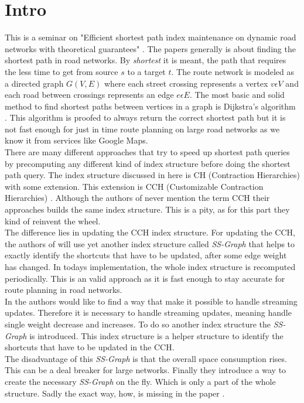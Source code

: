 \documentclass[twocolumn]{article}
\begin{document}


\section{Intro}

This is a seminar on "Efficient shortest path index maintenance on dynamic
road networks with theoretical guarantees" \cite{Ouyang2020}. The papers generally is
about finding the shortest path in road networks. By \textit{shortest} it is meant,
the path that requires the less time to get from source $s$ to a target $t$. The route
network is modeled as a directed graph $G(V,E)$ where each street crossing represents a
vertex $v \epsilon V$ and each road between crossings represents an edge $e \epsilon E$.
The most basic and solid method to find shortest paths between vertices in a graph is
Dijkstra's algorithm \cite{Dijkstra1959}. This algorithm is proofed to always return the
correct shortest path but it is not fast enough for just in time route planning on large
road networks as we know it from services like Google Maps.
\\
There are many
different approaches that try to speed up shortest path queries by precomputing
any different kind of index structure before doing the shortest path query. The index
structure discussed in here \cite{Ouyang2020} is CH (Contraction Hierarchies)\cite{Geisberger}
with some extension. This extension is CCH (Customizable Contraction Hierarchies)
\cite{Dibbelt2014}. Although the authors of \cite{Ouyang2020} never mention the term
CCH their approaches builds the same index structure. This is a pity, as for this part
they kind of reinvent the wheel.
\\
The difference lies in updating
the CCH index structure. For updating the CCH, the authors of \cite{Ouyang2020} will use yet another
index structure called \textit{SS-Graph} that helps to exactly identify the shortcuts that
have to be updated, after some edge weight has changed. In todays implementation, the whole
index structure is recomputed periodically. This is an valid approach as it is fast enough
to stay accurate for route planning in road networks.
\\
In \cite{Ouyang2020} the authors would like to find a way that make it possible to handle streaming
updates. Therefore it is necessary to handle streaming updates, meaning handle single weight decrease
and increases. To do so another index structure the \textit{SS-Graph} is introduced.
This index structure is a helper structure to identify the shortcuts
that have to be updated in the CCH.
\\
The disadvantage of this \textit{SS-Graph} is that the overall space consumption rises.
This can be a deal breaker for large networks.
Finally they introduce a way to create the necessary \textit{SS-Graph} on the fly. Which
is only a part of the whole structure.
Sadly the exact way, how, is missing in the paper \cite{Ouyang2020}.
\end{document}
